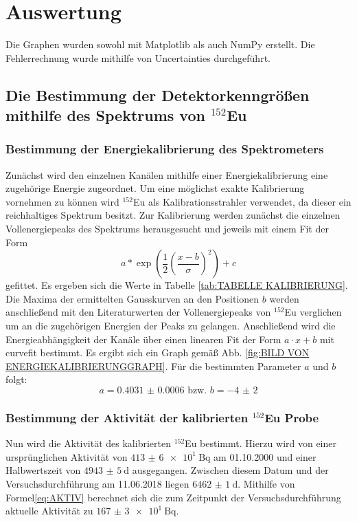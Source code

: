 \section{Auswertung}
\label{sec:Auswertung}
Die Graphen wurden sowohl mit Matplotlib \cite{matplotlib} als auch NumPy \cite{numpy} erstellt. Die
Fehlerrechnung wurde mithilfe von Uncertainties \cite{uncertainties} durchgeführt.
\subsection{Die Bestimmung der Detektorkenngrößen mithilfe des Spektrums von $^{152}$Eu} 
\subsubsection{Bestimmung der Energiekalibrierung des Spektrometers}
Zunächst wird den einzelnen Kanälen mithilfe einer Energiekalibrierung eine zugehörige Energie zugeordnet. Um eine möglichst exakte Kalibrierung vornehmen zu können wird $^{152}$Eu als Kalibrationsstrahler verwendet, da dieser ein reichhaltiges Spektrum besitzt. Zur Kalibrierung werden zunächst die einzelnen Vollenergiepeaks des Spektrums herausgesucht und jeweils mit einem Fit der Form
\begin{equation}
    a * \exp\left(\frac{1}{2}\left( \frac{x-b}{\sigma}\right)^2\right) +c
\end{equation}
gefittet. Es ergeben sich die Werte in Tabelle \ref{tab:TABELLE KALIBRIERUNG}. Die Maxima der ermittelten Gausskurven an den Positionen $b$ werden anschließend mit den Literaturwerten der Vollenergiepeaks von $^{152}$Eu\cite{Eu152} verglichen um an die zugehörigen Energien der Peaks zu gelangen. Anschließend wird die Energieabhängigkeit der Kanäle über einen linearen Fit der Form $a \cdot x+b $ mit curvefit \cite{scipy} bestimmt. Es ergibt sich ein Graph gemäß Abb. \ref{fig:BILD VON ENERGIEKALIBRIERUNGGRAPH}. Für die bestimmten Parameter $a$ und $b$ folgt:
\begin{equation}
a = \num{0.4031(6)} \text{ bzw. } b = \num{-4(2)}
\end{equation}

\subsubsection{Bestimmung der Aktivität der kalibrierten $^{152}$Eu Probe}
Nun wird die Aktivität des kalibrierten $^{152}$Eu bestimmt. Hierzu wird von einer ursprünglichen Aktivität von $\SI{413(6)e1}{\becquerel}$ am 01.10.2000 und einer Halbwertszeit von $\SI{4943(5)}{\day}$\cite{V18} ausgegangen. Zwischen diesem Datum und der Versuchsdurchführung am 11.06.2018 liegen $\SI{6462(1)}{\day}$. Mithilfe von Formel\ref{eq:AKTIV} berechnet sich die zum Zeitpunkt der Versuchsdurchführung aktuelle Aktivität zu $\SI{167(3)e1}{\becquerel}$.
